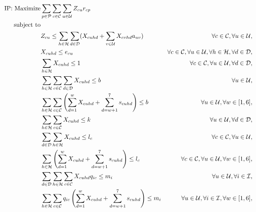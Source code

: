 \documentclass[11pt]{article}
\begin{document}
\begin{align}
\text{IP: }\text{Maximize} & \displaystyle
\sum\limits_{p\in \mathcal{P}}\sum\limits_{c\in \mathcal{C}}\sum\limits_{u\in \mathcal{U}}Z_{{c}{u}} r_{{c}{p}} \label{mathmodel_w/n_obj}&
\\
\text{subject to} \notag\\
&Z_{{c}{u}} \leq \sum\limits_{h\in \mathcal{H}}\sum\limits_{d\in \mathcal{D}}(X_{{c}{u}{h}{d}}+\sum\limits_{v\in\mathcal{U}}X_{{c}{v}{h}{d}}a_{{u}{v}}) &\forall c \in \mathcal{C}, \forall u \in \mathcal{U},\label{mathmodel_w/n_netcoverage}&\\
&X_{{c}{u}{h}{d}} \leq e_{{c}{u}}&\forall c \in \mathcal{C}, \forall u \in \mathcal{U}, \forall h \in \mathcal{H}, \forall d \in \mathcal{D}, \label{mathmodel_eligibility}&\\
&\sum\limits_{h\in\mathcal{H}}X_{{c}{u}{h}{d}} \leq 1 &\forall c \in \mathcal{C}, \forall u \in \mathcal{U}, \forall d \in \mathcal{D}, \label{mathmodel_singlechannel}&\\
&\sum\limits_{h\in\mathcal{H}}\sum\limits_{c\in\mathcal{C}}\sum\limits_{d\in\mathcal{D}}X_{{c}{u}{h}{d}} \leq b &\forall u \in \mathcal{U}, \label{mathmodel_percustomercommlimit}&\\
&\sum\limits_{h\in\mathcal{H}}\sum\limits_{c\in\mathcal{C}}\left(\sum_{d=1}^{w}X_{{c}{u}{h}{d}} + \sum_{d=w+1}^{7}s_{{c}{u}{h}{d}}\right) \leq b &\forall u \in \mathcal{U}, \forall w \in [1,6], \label{mathmodel_percustomercommlimit_rh}&\\
&\sum\limits_{h\in\mathcal{H}}\sum\limits_{c\in\mathcal{C}}X_{{c}{u}{h}{d}} \leq k &\forall u \in \mathcal{U}, \forall d \in \mathcal{D}, \label{mathmodel_percustomercommlimit_day}&\\
&\sum\limits_{d\in\mathcal{D}}\sum\limits_{h\in\mathcal{H}}X_{{c}{u}{h}{d}} \leq l_{c} &\forall c \in \mathcal{C}, \forall u \in \mathcal{U}, \label{mathmodel_percustomercamplimit}&\\
&\sum\limits_{h\in\mathcal{H}}\left( \sum_{d=1}^{w}X_{{c}{u}{h}{d}} + \sum_{d=w+1}^{7}s_{{c}{u}{h}{d}}\right) \leq l_{c} &\forall c \in \mathcal{C}, \forall u \in \mathcal{U}, \forall w \in [1,6], \label{mathmodel_percustomercamplimit_rh}&\\
&\sum\limits_{d\in\mathcal{D}}\sum\limits_{h\in\mathcal{H}}\sum\limits_{c\in\mathcal{C}}X_{{c}{u}{h}{d}}  q_{{i}{c}} \leq m_{i} &\forall u \in \mathcal{U}, \forall i \in \mathcal{I}, \label{mathmodel_weeklyquotalimit}&\\
&\sum\limits_{h\in\mathcal{H}}\sum\limits_{c\in\mathcal{C}}q_{{i}{c}}\left(\sum_{d=1}^{w}X_{{c}{u}{h}{d}} + \sum_{d=w+1}^{7}s_{{c}{u}{h}{d}}\right) \leq m_{i} &\forall u \in \mathcal{U}, \forall i \in \mathcal{I}, \forall w \in [1,6], \label{mathmodel_weeklyquotalimit_rh}&\\

\end{align}
\end{document}
